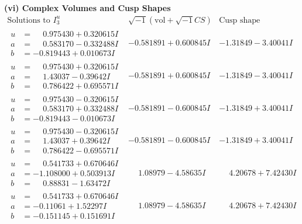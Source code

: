 \documentclass[1p]{elsarticle_modified}
\theoremstyle{definition}
\newcommand{\I}{\sqrt{-1}}
\begin{document}
\newpage\flushleft \textbf{(vi) Complex Volumes and Cusp Shapes}
$$\begin{array}{c|c|c}  
\text{Solutions to }I^u_{3}& \I (\text{vol} + \sqrt{-1}CS) & \text{Cusp shape}\\
 \hline 
\begin{aligned}
u &= \phantom{-}0.975430 + 0.320615 I \\
a &= \phantom{-}0.583170 - 0.332488 I \\
b &= -0.819443 + 0.010673 I\end{aligned}
 & -0.581891 + 0.600845 I & -1.31849 - 3.40041 I \\ \hline\begin{aligned}
u &= \phantom{-}0.975430 + 0.320615 I \\
a &= \phantom{-}1.43037 - 0.39642 I \\
b &= \phantom{-}0.786422 + 0.695571 I\end{aligned}
 & -0.581891 + 0.600845 I & -1.31849 - 3.40041 I \\ \hline\begin{aligned}
u &= \phantom{-}0.975430 - 0.320615 I \\
a &= \phantom{-}0.583170 + 0.332488 I \\
b &= -0.819443 - 0.010673 I\end{aligned}
 & -0.581891 - 0.600845 I & -1.31849 + 3.40041 I \\ \hline\begin{aligned}
u &= \phantom{-}0.975430 - 0.320615 I \\
a &= \phantom{-}1.43037 + 0.39642 I \\
b &= \phantom{-}0.786422 - 0.695571 I\end{aligned}
 & -0.581891 - 0.600845 I & -1.31849 + 3.40041 I \\ \hline\begin{aligned}
u &= \phantom{-}0.541733 + 0.670646 I \\
a &= -1.108000 + 0.503913 I \\
b &= \phantom{-}0.88831 - 1.63472 I\end{aligned}
 & \phantom{-}1.08979 - 4.58635 I & \phantom{-}4.20678 + 7.42430 I \\ \hline\begin{aligned}
u &= \phantom{-}0.541733 + 0.670646 I \\
a &= -0.11061 + 1.52297 I \\
b &= -0.151145 + 0.151691 I\end{aligned}
 & \phantom{-}1.08979 - 4.58635 I & \phantom{-}4.20678 + 7.42430 I \\ \hline\begin{aligned}

\end{aligned}
\end{array}$$
\end{document}
